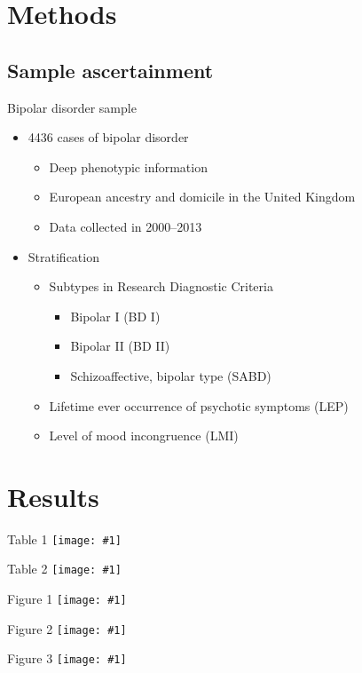 \documentclass{beamer}
\newcommand*{\solo}[1]{\centering\texttt{[image: \#1]}}
\begin{document}
\section{Methods}
\subsection{Sample ascertainment}
\begin{frame}{Bipolar disorder sample}
    \begin{itemize}
        \item 4436 cases of bipolar disorder
            \begin{itemize}
                \item Deep phenotypic information
                \item European ancestry and domicile in the United Kingdom
                \item Data collected in 2000--2013
            \end{itemize}
        \item Stratification
            \begin{itemize}
                \item Subtypes in Research Diagnostic Criteria
                    \begin{itemize}
                        \item Bipolar I (BD I)
                        \item Bipolar II (BD II)
                        \item Schizoaffective, bipolar type (SABD)
                    \end{itemize}
                \item Lifetime ever occurrence of psychotic symptoms (LEP)
                \item Level of mood incongruence (LMI)
            \end{itemize}
    \end{itemize}
\end{frame}

\section{Results}
\begin{frame}{Table 1}
    \solo{T1.eps}
\end{frame}

\begin{frame}{Table 2}
    \solo{T2.eps}
\end{frame}

\begin{frame}{Figure 1}
    \solo{F1.eps}
\end{frame}

\begin{frame}{Figure 2}
    \solo{F2.eps}
\end{frame}

\begin{frame}{Figure 3}
    \solo{F3.eps}
\end{frame}
\end{document}
